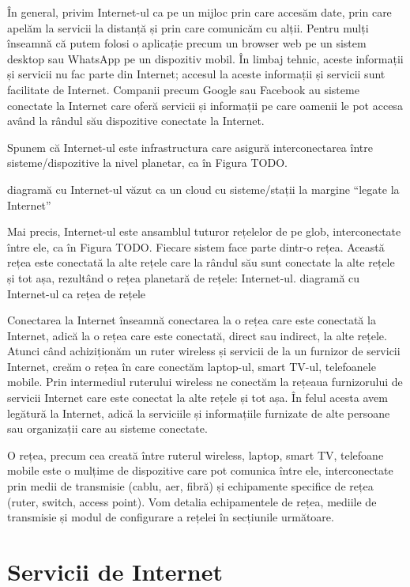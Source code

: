 În general, privim Internet-ul ca pe un mijloc prin care accesăm date, prin care apelăm la servicii la distanță și prin care comunicăm cu alții. Pentru mulți înseamnă că putem folosi o aplicație precum un browser web pe un sistem desktop sau WhatsApp pe un dispozitiv mobil. În limbaj tehnic, aceste informații și servicii nu fac parte din Internet; accesul la aceste informații și servicii sunt facilitate de Internet. Companii precum Google sau Facebook au sisteme conectate la Internet care oferă servicii și informații pe care oamenii le pot accesa având la rândul său dispozitive conectate la Internet.

Spunem că Internet-ul este infrastructura care asigură interconectarea între sisteme/dispozitive la nivel planetar, ca în Figura TODO.

diagramă cu Internet-ul văzut ca un cloud cu sisteme/stații la margine “legate la Internet”

Mai precis, Internet-ul este ansamblul tuturor rețelelor de pe glob, interconectate între ele, ca în Figura TODO. Fiecare sistem face parte dintr-o rețea. Această rețea este conectată la alte rețele care la rândul său sunt conectate la alte rețele și tot așa, rezultând o rețea planetară de rețele: Internet-ul.
diagramă cu Internet-ul ca rețea de rețele

Conectarea la Internet înseamnă conectarea la o rețea care este conectată la Internet, adică la o rețea care este conectată, direct sau indirect, la alte rețele. Atunci când achiziționăm un ruter wireless și servicii de la un furnizor de servicii Internet, creăm o rețea în care conectăm laptop-ul, smart TV-ul, telefoanele mobile. Prin intermediul ruterului wireless ne conectăm la rețeaua furnizorului de servicii Internet care este conectat la alte rețele și tot așa. În felul acesta avem legătură la Internet, adică la serviciile și informațiile furnizate de alte persoane sau organizații care au sisteme conectate.

O rețea, precum cea creată între ruterul wireless, laptop, smart TV, telefoane mobile este o mulțime de dispozitive care pot comunica între ele, interconectate prin medii de transmisie (cablu, aer, fibră) și echipamente specifice de rețea (ruter, switch, access point). Vom detalia echipamentele de rețea, mediile de transmisie și modul de configurare a rețelei în secțiunile următoare.

\section{Servicii de Internet}
\label{sec:net:internet-services}

